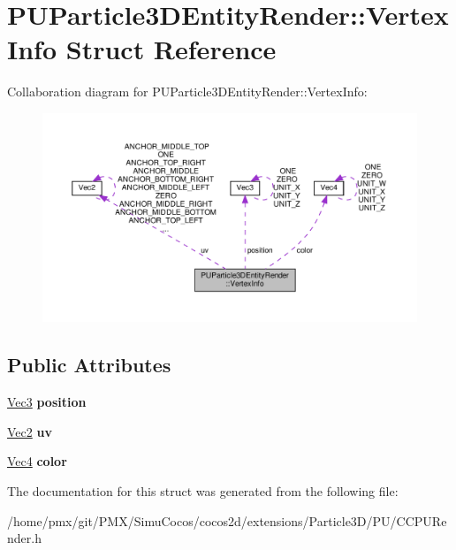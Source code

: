 \hypertarget{structPUParticle3DEntityRender_1_1VertexInfo}{}\section{P\+U\+Particle3\+D\+Entity\+Render\+:\+:Vertex\+Info Struct Reference}
\label{structPUParticle3DEntityRender_1_1VertexInfo}


Collaboration diagram for P\+U\+Particle3\+D\+Entity\+Render\+:\+:Vertex\+Info\+:
\nopagebreak
\begin{figure}[H]
\begin{center}
\leavevmode
\includegraphics[width=350pt]{structPUParticle3DEntityRender_1_1VertexInfo__coll__graph}
\end{center}
\end{figure}
\subsection*{Public Attributes}
\begin{DoxyCompactItemize}
\item 
\mbox{\label{structPUParticle3DEntityRender_1_1VertexInfo_a21b46a22c12b389bbaaa5270ccfd7d31}} 
\hyperlink{classVec3}{Vec3} {\bfseries position}
\item 
\mbox{\label{structPUParticle3DEntityRender_1_1VertexInfo_a41a570b6943e242f9e87df23ed644c68}} 
\hyperlink{classVec2}{Vec2} {\bfseries uv}
\item 
\mbox{\label{structPUParticle3DEntityRender_1_1VertexInfo_a305fd00ef3ad62dc1b9efdf247ec3a6f}} 
\hyperlink{classVec4}{Vec4} {\bfseries color}
\end{DoxyCompactItemize}


The documentation for this struct was generated from the following file\+:\begin{DoxyCompactItemize}
\item 
/home/pmx/git/\+P\+M\+X/\+Simu\+Cocos/cocos2d/extensions/\+Particle3\+D/\+P\+U/C\+C\+P\+U\+Render.\+h\end{DoxyCompactItemize}
